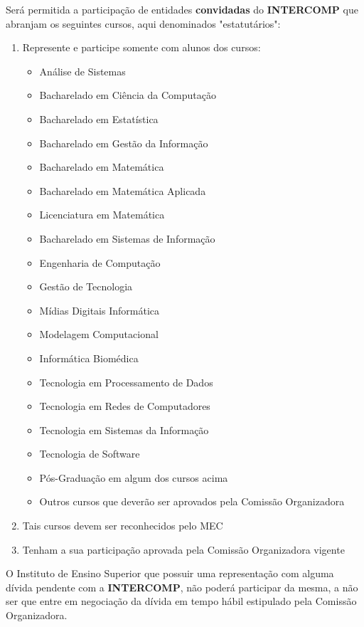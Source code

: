\begin{article}
	\begin{xparagraph}
		Será permitida a participação de entidades \textbf{convidadas} do \textbf{INTERCOMP} que abranjam os seguintes cursos, aqui denominados "estatutários":
		\begin{enumerate}[noitemsep,leftmargin=2\parindent]
			\item Represente e participe somente com alunos dos cursos:
			\begin{itemize}[noitemsep]
				\item Análise de Sistemas
				\item Bacharelado em Ciência da Computação
				\item Bacharelado em Estatística
				\item Bacharelado em Gestão da Informação
				\item Bacharelado em Matemática
				\item Bacharelado em Matemática Aplicada
				\item Licenciatura em Matemática
				\item Bacharelado em Sistemas de Informação
				\item Engenharia de Computação
				\item Gestão de Tecnologia
				\item Mídias Digitais Informática
				\item Modelagem Computacional
				\item Informática Biomédica
				\item Tecnologia em Processamento de Dados
				\item Tecnologia em Redes de Computadores
				\item Tecnologia em Sistemas da Informação
				\item Tecnologia de Software
				\item Pós-Graduação em algum dos cursos acima
				\item Outros cursos que deverão ser aprovados pela Comissão Organizadora
			\end{itemize}

			\item Tais cursos devem ser reconhecidos pelo MEC
			\item Tenham a sua participação aprovada pela Comissão Organizadora vigente
		\end{enumerate}
	\end{xparagraph}

	\begin{xparagraph}
		\label{par:resol.dividas}
		O Instituto de Ensino Superior que possuir uma representação com alguma dívida pendente com a \textbf{INTERCOMP}, não poderá participar da mesma, a não ser que entre em negociação da dívida em tempo hábil estipulado pela Comissão Organizadora.
	\end{xparagraph}


\end{article}
